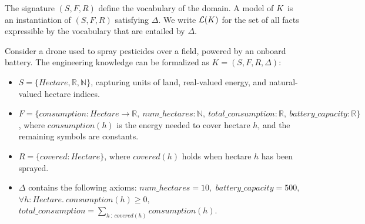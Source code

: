 The signature $(S, F, R)$ define the {vocabulary} of the domain. A model of $K$ is an instantiation of $(S,F,R)$ satisfying $\Delta$. We write $\mathcal{L}(K)$ for the set of all facts expressible by the vocabulary that are entailed by $\Delta$.








\begin{example}%
\label{ex:drone-ontology}
Consider a drone used to spray pesticides over a field, powered by an onboard 
battery. The engineering knowledge can be formalized as $K = (S, F, R, \Delta)$: 
\begin{itemize}
  \item $S = \{\mathit{Hectare}, \mathbb{R}, \mathbb{N}\}$, capturing units of 
        land, real-valued energy, and natural-valued hectare indices.
  \item $F = \{\mathit{consumption} : \mathit{Hectare} \to \mathbb{R},\ 
        \mathit{num\_hectares} : \mathbb{N},\ \mathit{total\_consumption} : 
        \mathbb{R},\ \mathit{battery\_capacity} : \mathbb{R}\}$, where 
        $\mathit{consumption}(h)$ is the energy needed to cover hectare $h$, 
        and the remaining symbols are constants.
  \item $R = \{\mathit{covered} : \mathit{Hectare}\}$, where $\mathit{covered}(h)$ 
        holds when hectare $h$ has been sprayed.
  \item $\Delta$ contains the following axioms: $
          \mathit{num\_hectares} = 10,$ $ 
          \mathit{battery\_capacity} = 500,$ $
          \forall h : \mathit{Hectare}.\ \mathit{consumption}(h) \geq 0,$ $\mathit{total\_consumption} = 
          \textstyle\sum_{h\,:\,\mathit{covered}(h)} \mathit{consumption}(h).$
\end{itemize}

\end{example}

